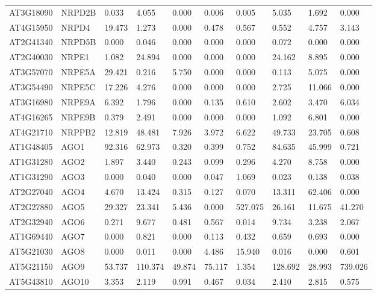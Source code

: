\begin{landscape}
\begin{longtable}{l|l|lll|ll|lll}
AT3G18090 & NRPD2B   & 0.033  & 4.055   & 0.000    & 0.006  & 0.005    & 5.035   & 1.692  & 0.000    \\
AT4G15950 & NRPD4    & 19.473 & 1.273   & 0.000    & 0.478  & 0.567    & 0.552   & 4.757  & 3.143    \\
AT2G41340 & NRPD5B   & 0.000  & 0.046   & 0.000    & 0.000  & 0.000    & 0.072   & 0.000  & 0.000    \\
AT2G40030 & NRPE1    & 1.082  & 24.894  & 0.000    & 0.000  & 0.000    & 24.162  & 8.895  & 0.000    \\
AT3G57070 & NRPE5A   & 29.421 & 0.216   & 5.750    & 0.000  & 0.000    & 0.113   & 5.075  & 0.000    \\
AT3G54490 & NRPE5C   & 17.226 & 4.276   & 0.000    & 0.000  & 0.000    & 2.725   & 11.066 & 0.000    \\
AT3G16980 & NRPE9A   & 6.392  & 1.796   & 0.000    & 0.135  & 0.610    & 2.602   & 3.470  & 6.034    \\
AT4G16265 & NRPE9B   & 0.379  & 2.491   & 0.000    & 0.000  & 0.000    & 1.092   & 6.801  & 0.000    \\
AT4G21710 & NRPPB2   & 12.819 & 48.481  & 7.926    & 3.972  & 6.622    & 49.733  & 23.705 & 0.608    \\ \hline
AT1G48405 & AGO1     & 92.316 & 62.973  & 0.320    & 0.399  & 0.752    & 84.635  & 45.999 & 0.721    \\
AT1G31280 & AGO2     & 1.897  & 3.440   & 0.243    & 0.099  & 0.296    & 4.270   & 8.758  & 0.000    \\
AT1G31290 & AGO3     & 0.000  & 0.040   & 0.000    & 0.047  & 1.069    & 0.023   & 0.138  & 0.038    \\
AT2G27040 & AGO4     & 4.670  & 13.424  & 0.315    & 0.127  & 0.070    & 13.311  & 62.406 & 0.000    \\
AT2G27880 & AGO5     & 29.327 & 23.341  & 5.436    & 0.000  & 527.075  & 26.161  & 11.675 & 41.270   \\
AT2G32940 & AGO6     & 0.271  & 9.677   & 0.481    & 0.567  & 0.014    & 9.734   & 3.238  & 2.067    \\
AT1G69440 & AGO7     & 0.000  & 0.821   & 0.000    & 0.113  & 0.432    & 0.659   & 0.693  & 0.000    \\
AT5G21030 & AGO8     & 0.000  & 0.011   & 0.000    & 4.486  & 15.940   & 0.016   & 0.000  & 0.601    \\
AT5G21150 & AGO9     & 53.737 & 110.374 & 49.874   & 75.117 & 1.354    & 128.692 & 28.993 & 739.026  \\
AT5G43810 & AGO10    & 3.353  & 2.119   & 0.991    & 0.467  & 0.034    & 2.410   & 2.815  & 0.575    \\ \hline

\end{longtable}
\end{landscape}
